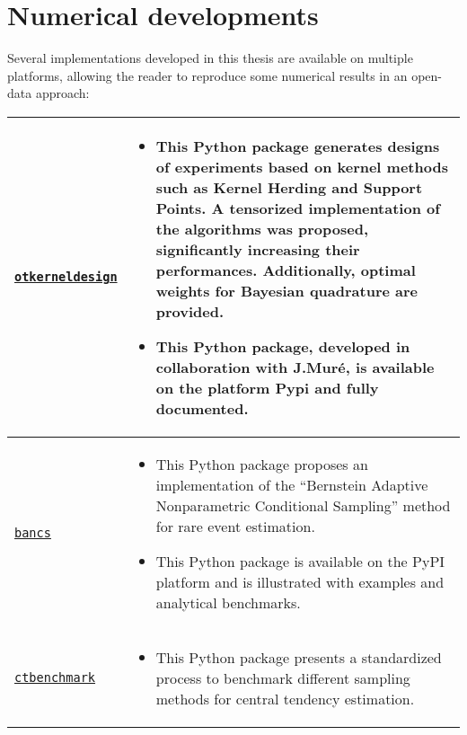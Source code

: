 \clearpage
\section*{Numerical developments}

Several implementations developed in this thesis are available on multiple platforms, allowing the reader to reproduce some numerical results in an open-data approach:  

\begin{center}
\footnotesize
\begin{tabularx}{\textwidth}{l >{\raggedleft\arraybackslash}X}
    \texttt{\href{https://efekhari27.github.io/otkerneldesign/master/}{otkerneldesign}}\footnotemark
    &    
    \begin{itemize}[left=0pt]
        \item This Python package generates designs of experiments based on kernel methods such as Kernel Herding and Support Points. 
        A tensorized implementation of the algorithms was proposed, significantly increasing their performances. 
        Additionally, optimal weights for Bayesian quadrature are provided. 
        \item This Python package, developed in collaboration with J.Muré, is available on the platform Pypi and fully documented.
    \end{itemize}\\ \hline
    \texttt{\href{https://github.com/efekhari27/bancs}{bancs}}\footnotemark &    
    \begin{itemize}[left=0pt]
        \item This Python package proposes an implementation of the ``Bernstein Adaptive Nonparametric Conditional Sampling'' method for rare event estimation. 
        \item This Python package is available on the PyPI platform and is illustrated with examples and analytical benchmarks.
    \end{itemize}\\ \hline
    \texttt{\href{https://github.com/efekhari27/ctbenchmark}{ctbenchmark}}\footnotemark &    
    \begin{itemize}[left=0pt]
        \item This Python package presents a standardized process to benchmark different sampling methods for central tendency estimation. 

\end{itemize}
\end{tabularx}
\end{center}
